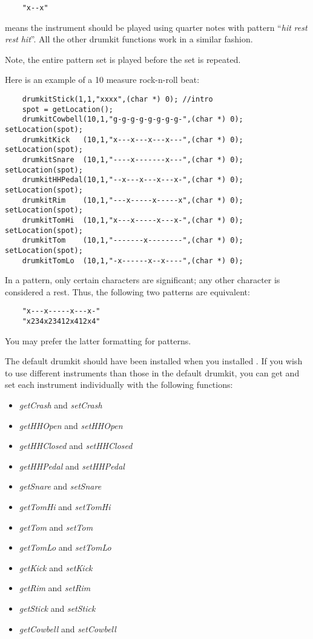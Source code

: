 \documentclass{article}
\begin{document}
\begin{verbatim}
    "x--x"
\end{verbatim}

means the instrument should be played using quarter notes with pattern
``{\it hit} {\it rest} {\it rest} {\it hit}''. All the other drumkit
functions work in a similar fashion.

Note, the entire pattern set is played before the set is repeated.

Here is an example of a 10 measure rock-n-roll beat:

\begin{verbatim}
    drumkitStick(1,1,"xxxx",(char *) 0); //intro
    spot = getLocation();
    drumkitCowbell(10,1,"g-g-g-g-g-g-g-g-",(char *) 0); setLocation(spot);
    drumkitKick   (10,1,"x---x---x---x---",(char *) 0); setLocation(spot);
    drumkitSnare  (10,1,"----x-------x---",(char *) 0); setLocation(spot);
    drumkitHHPedal(10,1,"--x---x---x---x-",(char *) 0); setLocation(spot);
    drumkitRim    (10,1,"---x-----x-----x",(char *) 0); setLocation(spot);
    drumkitTomHi  (10,1,"x---x-----x---x-",(char *) 0); setLocation(spot);
    drumkitTom    (10,1,"-------x--------",(char *) 0); setLocation(spot);
    drumkitTomLo  (10,1,"-x------x--x----",(char *) 0); 
\end{verbatim}

In a pattern, only certain characters are significant; any other character
is considered a rest. Thus, the following two patterns are
equivalent:

\begin{verbatim}
    "x---x-----x---x-"
    "x234x23412x412x4"
\end{verbatim}

You may prefer the latter formatting for patterns.

The default drumkit should have been installed when you installed
\songlib.
If you wish to use different instruments than those in the default drumkit,
you can get and set each instrument individually with the following functions:

\begin{itemize}
\item
    {\it getCrash}
    and {\it setCrash}
\item
    {\it getHHOpen}
    and {\it setHHOpen}
\item
    {\it getHHClosed}
    and {\it setHHClosed}
\item
    {\it getHHPedal}
    and {\it setHHPedal}
\item
    {\it getSnare}
    and {\it setSnare}
\item
    {\it getTomHi}
    and {\it setTomHi}
\item
    {\it getTom}
    and {\it setTom}
\item
    {\it getTomLo}
    and {\it setTomLo}
\item
    {\it getKick}
    and {\it setKick}
\item
    {\it getRim}
    and {\it setRim}
\item
    {\it getStick}
    and {\it setStick}
\item
    {\it getCowbell}
    and {\it setCowbell}
\end{itemize}
    
\end{document}
